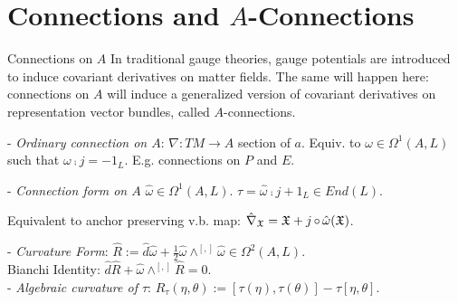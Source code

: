 \section{Connections and $A$-Connections}

\begin{frame}{Connections on $A$}
    In traditional gauge theories, gauge potentials are introduced to induce covariant derivatives on matter fields.
    The same will happen here: connections on $A$ will induce a generalized version of covariant derivatives on representation vector bundles, called $A$-connections.
    
    - \emph{Ordinary connection on $A$}: $\nabla: TM \to A$ section of $a$. Equiv. to $\omega \in \Omega^1(A, L)$ such that $\omega \comp j = -1_L$.  E.g. connections on $P$ and $E$.
    
    - \emph{Connection form on $A$} $\hat \omega \in \Omega^1(A, L)$. $\tau = \hat \omega \comp j + 1_L \in End(L)$.
    
    Equivalent to anchor preserving v.b. map: $\hat \nabla_{\mathfrak{X}} = \mathfrak{X} + j \operatorname{\circ} \hat \omega(\mathfrak{X})$.
    
    - \emph{Curvature Form}: $\hat R := \hat d \hat \omega + \frac{1}{2} \hat \omega \wedge^{[,]} \hat \omega \in \Omega^2(A, L)$. \\Bianchi Identity: $\hat d \hat R + \hat \omega \wedge^{[,]} \hat R = 0$.\\ - \emph{Algebraic curvature of $\tau$}: $R_\tau(\eta, \theta) := [\tau(\eta), \tau(\theta)] - \tau[\eta, \theta]$. 
\end{frame}



